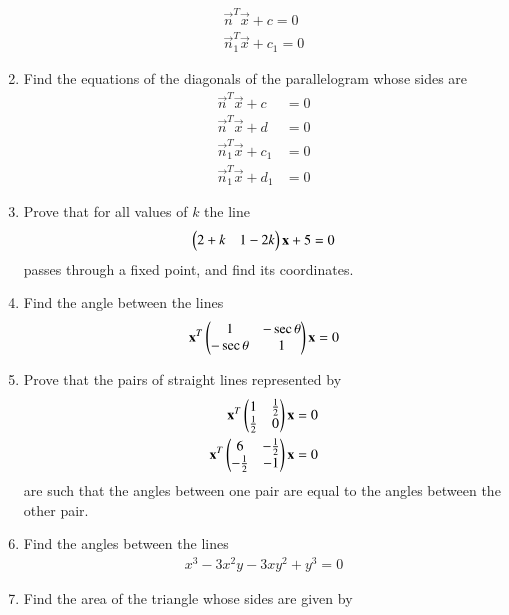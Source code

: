 \begin{enumerate}[label=\arabic*.,ref=\thesubsection.\theenumi]
\begin{align}
\vec{n}^T\vec{x}+c=0
\\
\vec{n}_1^T\vec{x}+c_1=0
\end{align}
\item Find  the equations of the diagonals of the parallelogram whose sides are
\begin{align}
\vec{n}^T\vec{x}+c&=0
\\
\vec{n}^T\vec{x}+d&=0
\\
\vec{n}_1^T\vec{x}+c_1&=0
\\
\vec{n}_1^T\vec{x}+d_1&=0
\end{align}
\renewcommand{\theequation}{\theenumi}
\item Prove that for all values of $k$ the line
\begin{align}
\begin{pmatrix}2+k &1-2k\end{pmatrix}\mathbf{x} + 5 = 0
\end{align}
passes through a fixed point, and find its coordinates.
\item Find the angle between the lines
\begin{align}
\mathbf{x}^T
\begin{pmatrix}1 & -\sec \theta\\-\sec\theta & 1\end{pmatrix} 
\mathbf{x} = 0
\end{align}
\item Prove that the pairs of straight lines represented by
\begin{align}
\mathbf{x}^T
\begin{pmatrix}1 & \frac{1}{2}\\\frac{1}{2} & 0\end{pmatrix} 
\mathbf{x} = 0
\\
\mathbf{x}^T
\begin{pmatrix}6 & -\frac{1}{2}\\-\frac{1}{2} & -1\end{pmatrix} 
\mathbf{x} = 0
\end{align}
are such that the angles between one pair are equal to the angles between the other pair.
\renewcommand{\theequation}{\theenumi}
\item Find the angles between the lines
\begin{align}
x^3-3x^2y-3xy^2+y^3 = 0
\end{align}
\item Find the area of the triangle whose sides are given by

\end{enumerate}
